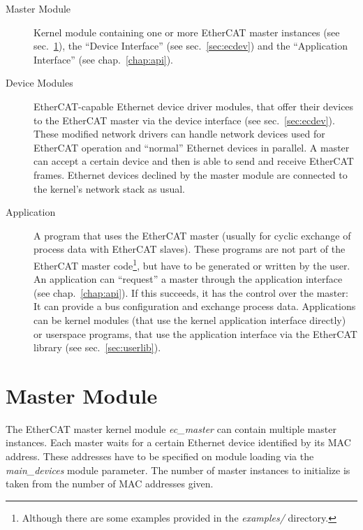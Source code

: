 \documentclass[a4paper,12pt,BCOR6mm,bibtotoc,idxtotoc]{scrbook}
\begin{document}
\begin{description}

\item[Master Module] Kernel module containing one or more
EtherCAT master instances (see sec.~\ref{sec:mastermod}), the ``Device
Interface'' (see sec.~\ref{sec:ecdev}) and the ``Application Interface'' (see
chap.~\ref{chap:api}).

\item[Device Modules] EtherCAT-capable Ethernet device
driver modules, that offer their devices to the EtherCAT
master via the device interface (see sec.~\ref{sec:ecdev}). These modified
network drivers can handle network devices used for EtherCAT operation and
``normal'' Ethernet devices in parallel. A master can accept a certain device
and then is able to send and receive EtherCAT frames. Ethernet devices
declined by the master module are connected to the kernel's network stack as
usual.

\item[Application] A program that uses the EtherCAT master
(usually for cyclic exchange of process data with EtherCAT slaves). These
programs are not part of the EtherCAT master code\footnote{Although there are
some examples provided in the \textit{examples/} directory.}, but have to be
generated or written by the user. An application can ``request'' a master
through the application interface (see chap.~\ref{chap:api}). If this
succeeds, it has the control over the master: It can provide a bus
configuration and exchange process data.  Applications can be kernel modules
(that use the kernel application interface directly) or userspace programs,
that use the application interface via the EtherCAT library (see
sec.~\ref{sec:userlib}).

\end{description}


\section{Master Module}
\label{sec:mastermod}

The EtherCAT master kernel module \textit{ec\_master} can contain multiple
master instances. Each master waits for a certain Ethernet device identified
by its MAC address. These addresses have to be specified on
module loading via the \textit{main\_devices} module parameter. The number of
master instances to initialize is taken from the number of MAC addresses
given.
\end{document}
